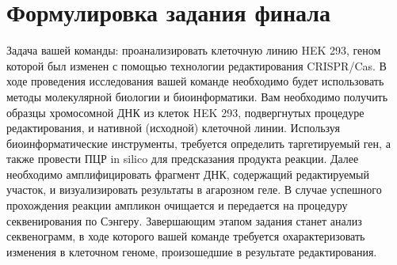 \section*{Формулировка задания финала}

Задача вашей команды:  проанализировать клеточную линию HEK 293, геном которой был изменен с помощью технологии редактирования CRISPR/Cas.
В ходе проведения исследования вашей команде необходимо будет использовать методы молекулярной биологии и биоинформатики.
Вам необходимо получить образцы хромосомной ДНК из клеток HEK 293, подвергнутых процедуре редактирования, и нативной (исходной) клеточной линии. Используя биоинформатические инструменты, требуется определить таргетируемый ген, а также провести ПЦР in silico для предсказания продукта реакции. Далее необходимо амплифицировать фрагмент ДНК, содержащий редактируемый участок, и визуализировать результаты в агарозном геле. В случае успешного прохождения реакции ампликон очищается и передается на процедуру секвенирования по Сэнгеру. Завершающим этапом задания станет анализ секвенограмм, в ходе которого вашей команде требуется охарактеризовать изменения в клеточном геноме, произошедшие в результате редактирования.

